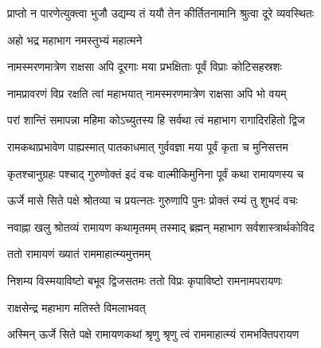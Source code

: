 \twolineshloka
{प्राप्तो न पारणेत्युक्त्वा भुजौ उद्यम्य तं ययौ}
{तेन कीर्तितनामानि श्रुत्वा दूरे व्यवस्थितः}%

 

\onelineshloka
{अहो भद्र महाभाग नमस्तुभ्यं महात्मने}%

 

\twolineshloka
{नामस्मरणमात्रेण राक्षसा अपि दूरगाः}
{मया प्रभक्षिताः पूर्वं विप्राः कोटिसहस्रशः}%

 

\twolineshloka
{नामप्रावरणं विप्र रक्षति त्वां महाभयात्}
{नामस्मरणमात्रेण राक्षसा अपि भो वयम्}%

 

\twolineshloka
{परां शान्तिं समापन्ना महिमा कोऽच्युतस्य हि}
{सर्वथा त्वं महाभाग रागादिरहितो द्विज}%

 

\twolineshloka
{रामकथाप्रभावेण पाह्यस्मात् पातकाधमात्}
{गुर्ववज्ञा मया पूर्वं कृता च मुनिसत्तम}%

 

\twolineshloka
{कृतश्चानुग्रहः पश्चाद् गुरुणोक्तं इदं वचः}
{वाल्मीकिमुनिना पूर्वं कथा रामायणस्य च}%

 

\twolineshloka
{ऊर्जे मासे सिते पक्षे श्रोतव्या च प्रयत्‍नतः}
{गुरुणापि पुनः प्रोक्तं रम्यं तु शुभदं वचः}%

 

\twolineshloka
{नवाह्ना खलु श्रोतव्यं रामायण कथामृतमम्}
{तस्माद् ब्रह्मन् महाभाग सर्वशास्त्रार्थकोविद}%

 


\onelineshloka
{ततो रामायणं ख्यातं राममाहात्म्यमुत्तमम्}%

 

\twolineshloka
{निशम्य विस्मयाविष्टो बभूव द्विजसतमः}
{ततो विप्रः कृपाविष्टो रामनामपरायणः}%

 


\onelineshloka
{राक्षसेन्द्र महाभाग मतिस्ते विमलाभवत्}%

 

\twolineshloka
{अस्मिन् ऊर्जे सिते पक्षे रामायणकथां श्रृणु}
{श्रृणु त्वं राममाहात्म्यं रामभक्तिपरायण}%

 


